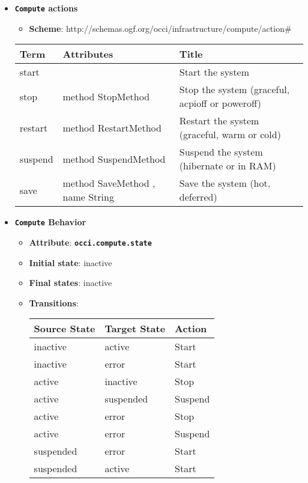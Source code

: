 \begin{itemize}
\item \textbf{\texttt{Compute} actions}

\begin{itemize}
	\item \textbf{Scheme}: http://schemas.ogf.org/occi/infrastructure/compute/action\#
\end{itemize}

\begin{center}
\begin{tabular}{|l|l|l|}
  \hline
  \textbf{Term}  & \textbf{Attributes} & \textbf{Title} \\
  \hline  
  start & & Start the system \\
  \hline
  stop &  method StopMethod & Stop the system (graceful, acpioff or poweroff) \\
  \hline
  restart &  method RestartMethod & Restart the system (graceful, warm or cold) \\
  \hline
  suspend &  method SuspendMethod & Suspend the system (hibernate or in RAM) \\
  \hline
  save &  method SaveMethod , name String & Save the system (hot, deferred) \\
  \hline
\end{tabular}
\end{center}
\end{itemize}

\begin{itemize}
\item \textbf{\texttt{Compute} Behavior}
\begin{itemize}
\item \textbf{Attribute}: \textbf{\texttt{occi.compute.state}}
\item \textbf{Initial state}: inactive
\item \textbf{Final states}:  	inactive
\item \textbf{Transitions}:

\begin{center}
\begin{tabular}{|l|l|l|}
  \hline
  \textbf{Source State} & \textbf{Target State} & \textbf{Action} \\
  \hline  
  inactive & active & Start  \\
  \hline
  inactive & error & Start  \\
  \hline
  active & inactive & Stop  \\
  \hline
  active & suspended & Suspend  \\
  \hline
  active & error & Stop  \\
  \hline
  active & error & Suspend  \\
  \hline
  suspended & error & Start  \\
  \hline
  suspended & active & Start  \\
  \hline
\end{tabular}
\end{center}
\end{itemize}
\end{itemize}

